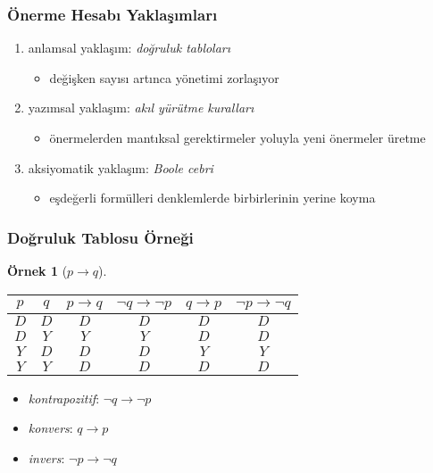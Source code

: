 \documentclass[dvipsnames]{beamer}
\theoremstyle{definition}
\theoremstyle{example}
\newtheorem{ornek}[theorem]{Örnek}
\theoremstyle{plain}
\begin{document}
\begin{frame}
  \frametitle{Önerme Hesabı Yaklaşımları}

  \begin{enumerate}
    \item anlamsal yaklaşım: \emph{doğruluk tabloları}
    \begin{itemize}
      \item değişken sayısı artınca yönetimi zorlaşıyor
    \end{itemize}

    \pause
    \item yazımsal yaklaşım: \emph{akıl yürütme kuralları}
    \begin{itemize}
      \item önermelerden mantıksal gerektirmeler yoluyla yeni önermeler üretme
    \end{itemize}

    \pause
    \item aksiyomatik yaklaşım: \emph{Boole cebri}
    \begin{itemize}
      \item eşdeğerli formülleri denklemlerde birbirlerinin yerine koyma
    \end{itemize}
  \end{enumerate}
\end{frame}

\begin{frame}
  \frametitle{Doğruluk Tablosu Örneği}

  \begin{ornek}[$p \rightarrow q$]
    \begin{center}
      \begin{tabular}{|c|c||c|c|c|c|}\hline
        $p$ & $q$ & $p \rightarrow q$ & $\neg q \rightarrow \neg p$ &
                    $q \rightarrow p$ & $\neg p \rightarrow \neg q$\\\hline\hline
        $D$ & $D$ & $D$ & $D$ & $D$ & $D$\\\hline
        $D$ & $Y$ & $Y$ & $Y$ & $D$ & $D$\\\hline
        $Y$ & $D$ & $D$ & $D$ & $Y$ & $Y$\\\hline
        $Y$ & $Y$ & $D$ & $D$ & $D$ & $D$\\\hline
      \end{tabular}
    \end{center}

    \pause
    \begin{itemize}
      \item \emph{kontrapozitif}: $\neg q \rightarrow \neg p$

      \pause
      \item \emph{konvers}: $q \rightarrow p$

      \pause
      \item \emph{invers}: $\neg p \rightarrow \neg q$
    \end{itemize}
  \end{ornek}
\end{frame}
\end{document}
